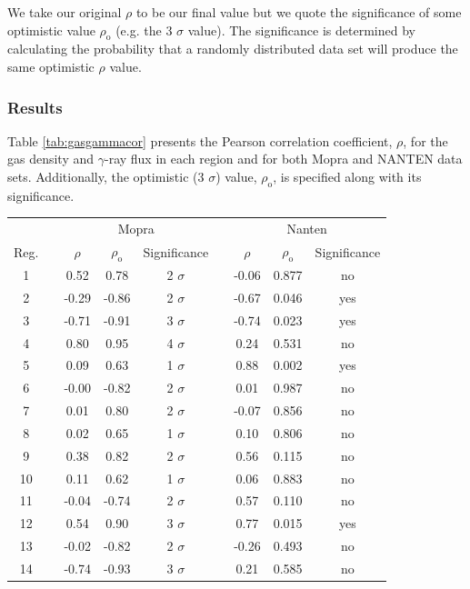\documentclass[12pt,a4paper]{article}
\begin{document}
We take our original $\rho$ to be our final value but we quote the significance of some optimistic value $\rho_\mathrm{o}$ (e.g. the 3 $\sigma$ value). The significance is determined by calculating the probability that a randomly distributed data set will produce the same optimistic $\rho$ value.


\subsubsection{Results}
Table \ref{tab:gasgammacor} presents the Pearson correlation coefficient, $\rho$, for the gas density and $\gamma$-ray flux in each region and for both Mopra and NANTEN data sets. Additionally, the optimistic (3 $\sigma$) value, $\rho_\mathrm{o}$, is specified along with its significance.
\begin{table}[H] 
	\centering
	\begin{tabular}{ccccccccc}
		\toprule 
		&&
		\multicolumn{3}{c}{Mopra} 
		&&
		\multicolumn{3}{c}{Nanten} \\
		\cline{2-5} \cline{7-9} 
		Reg. && $\rho$ & $\rho_\mathrm{o}$ & Significance && $\rho$ & $\rho_\mathrm{o}$ & Significance \\
		\hline 
		1 && 0.52 & 0.78 & 2 $\sigma$ && -0.06 & 0.877 & no \\
		2 && -0.29 & -0.86 & 2 $\sigma$ && -0.67 & 0.046 & yes \\
		3 && -0.71 & -0.91 & 3 $\sigma$ && -0.74 & 0.023 & yes \\
		4 && 0.80 & 0.95 & 4 $\sigma$ && 0.24 & 0.531 & no \\
		5 && 0.09 & 0.63 & 1 $\sigma$ && 0.88 & 0.002 & yes \\
		6 && -0.00 & -0.82 & 2 $\sigma$ && 0.01 & 0.987 & no \\ 
		7 && 0.01 & 0.80 & 2 $\sigma$ && -0.07 & 0.856 & no \\
		8 && 0.02 & 0.65 & 1 $\sigma$ && 0.10 & 0.806 & no \\
		9 && 0.38 & 0.82 & 2 $\sigma$ && 0.56 & 0.115 & no \\
		10 && 0.11 & 0.62 & 1 $\sigma$ && 0.06 & 0.883 & no \\
		11 && -0.04 & -0.74 & 2 $\sigma$ && 0.57 & 0.110 & no \\
		12 && 0.54 & 0.90 & 3 $\sigma$ && 0.77 & 0.015 & yes \\
		13 && -0.02 & -0.82 & 2 $\sigma$ && -0.26 & 0.493 & no \\
		14 && -0.74 & -0.93 & 3 $\sigma$ && 0.21 & 0.585 & no \\

\end{tabular}
\end{table}
\end{document}

